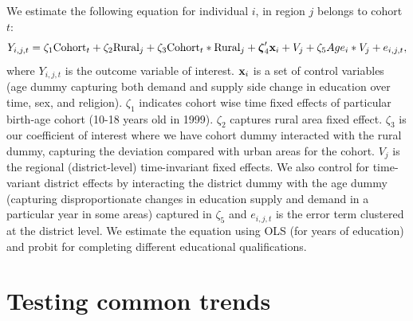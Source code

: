 \documentclass[12pt,letterpaper]{article}
\newcommand{\bfzeta}{\ensuremath{\mbox{\boldmath $\zeta$}}}
\newcommand{\bfx}{\ensuremath{\mbox{\bf x}}}
\newcommand{\0}{\ensuremath{\mbox{\boldmath $0$}}}
\begin{document}


We estimate the following equation for individual $i$, in region $j$ belongs to cohort $t$:
\begin{equation}
Y_{i,j,t} = \zeta_{1}\textnormal{Cohort}_{t}+
\zeta_{2}\textnormal{Rural}_{j}+ \zeta_{3}\textnormal{Cohort}_{t}*\textnormal{Rural}_{j}+
\bfzeta'_{4}\bfx_{i}+V_{j}+\zeta_{5}Age_{i}*{V}_{j}+e_{i,j,t},
\label{longruneqn}
\end{equation}
where $Y_{i,j,t}$ is the outcome variable of interest. $\bfx_{i}$ is a set of control variables (age dummy capturing both demand and supply side change in education over time, sex, and religion). $\zeta_{1}$ indicates cohort wise time fixed effects of particular birth-age cohort (10-18 years old in 1999). $\zeta_{2}$ captures rural area fixed effect. $\zeta_{3}$ is our coefficient of interest where we have cohort dummy interacted with the rural dummy, capturing the deviation compared with urban areas for the cohort. $V_{j}$ is the regional (district-level) time-invariant fixed effects.  We also control for time-variant district effects by interacting the district dummy with the age dummy (capturing disproportionate changes in education supply and demand in a particular year in some areas) captured in $\zeta_{5}$ and $e_{i,j,t}$ is the error term clustered at the district level. We estimate the equation using OLS (for years of education) and probit for completing different educational qualifications. 

\section{Testing common trends}
\end{document}
